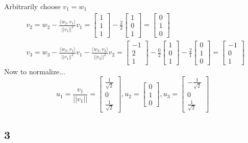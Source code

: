 \documentclass[10pt,letterpaper]{article}
\begin{document}
	Arbitrarily choose $v_1 = w_1$ 
	\begin{align*}
	&v_2 = w_2 - \frac{\langle w_2, v_1 \rangle}{||v_1||^2} v_1 = \begin{bmatrix}
	1 \\ 1 \\ 1
	\end{bmatrix} - \frac{2}{2} \begin{bmatrix}
	1 \\ 0 \\ 1
	\end{bmatrix} = \begin{bmatrix}
	0 \\ 1 \\ 0
	\end{bmatrix} \\
	& v_3 = w_3 - \frac{\langle w_3, v_1 \rangle}{||v_1||^2}v_1 - \frac{\langle w_3, v_2 \rangle}{||v_2||^2}v_2= \begin{bmatrix}
	-1 \\ 2 \\ 1
	\end{bmatrix} - \frac{0}{2} \begin{bmatrix}
	1 \\ 0 \\ 1
	\end{bmatrix} - \frac{2}{1} \begin{bmatrix}
	0 \\ 1 \\ 0
	\end{bmatrix} = \begin{bmatrix}
	-1 \\ 0 \\ 1
	\end{bmatrix}
	\end{align*}
	Now to normalize... 
	$$
	\boxed{u_1 = \frac{v_1}{||v_1||} = \begin{bmatrix}
	\frac{1}{\sqrt{2}} \\ 0 \\ \frac{1}{\sqrt{2}}
	\end{bmatrix}, u_2 = \begin{bmatrix}
	0 \\ 1 \\ 0
	\end{bmatrix}, u_3 = \begin{bmatrix}
	-\frac{1}{\sqrt{2}} \\ 0 \\ \frac{1}{\sqrt{2}}
	\end{bmatrix}}
	$$
	\subsection*{3}
\end{document}
